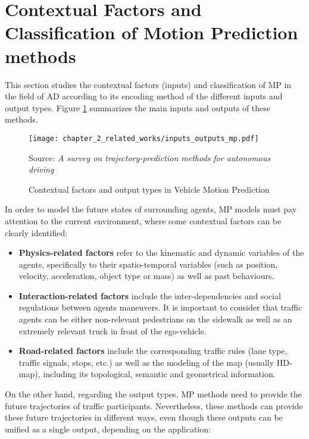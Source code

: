 \section{Contextual Factors and Classification of Motion Prediction methods}
\label{sec:2_contextual_factors_and_classification_mp}

This section studies the contextual factors (inputs) and classification of \ac{MP} in the field of \ac{AD} according to its encoding method of the different inputs and output types. Figure \ref{fig:chapter_2_related_works/input_output_mp} summarizes the main inputs and outputs of these methods. 

\begin{figure}[h]
	\centering
	\texttt{[image: chapter\_2\_related\_works/inputs\_outputs\_mp.pdf]}
	\caption{Contextual factors and output types in Vehicle Motion Prediction}
	Source: \textit{A survey on trajectory-prediction methods for autonomous driving} \cite{huang2022survey}
	\label{fig:chapter_2_related_works/input_output_mp}
\end{figure}

In order to model the future states of surrounding agents, \ac{MP} models must pay attention to the current environment, where some contextual factors can be clearly identified:

\begin{itemize}
	
	\item \textbf{Physics-related factors} refer to the kinematic and dynamic variables of the agents, specifically to their spatio-temporal variables (such as position, velocity, acceleration, object type or mass) as well as past behaviours. 
	
	\item \textbf{Interaction-related factors} include the inter-dependencies and social regulations between agents maneuvers. It is important to consider that traffic agents can be either non-relevant pedestrians on the sidewalk as well as an extremely relevant truck in front of the ego-vehicle.
	
	\item \textbf{Road-related factors} include the corresponding traffic rules (lane type, traffic signals, stops, etc.) as well as the modeling of the map (usually HD-map), including its topological, semantic and geometrical information.
	
\end{itemize}

On the other hand, regarding the output types, \ac{MP} methods need to provide the future trajectories of traffic participants. Nevertheless, these methods can provide these future trajectories in different ways, even though these outputs can be unified as a single output, depending on the application:

